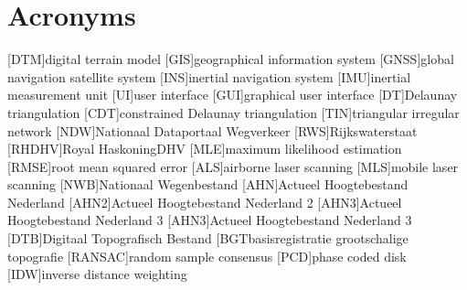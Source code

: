 \chapter*{Acronyms}

\begin{acronym}[UML]
  [DTM]{digital terrain model}
  [GIS]{geographical information system}
  [GNSS]{global navigation satellite system}
  [INS]{inertial navigation system}
  [IMU]{inertial measurement unit}
  [UI]{user interface}
  [GUI]{graphical user interface}
  [DT]{Delaunay triangulation}
  [CDT]{constrained Delaunay triangulation}
  [TIN]{triangular irregular network}
  [NDW]{Nationaal Dataportaal Wegverkeer}
  [RWS]{Rijkswaterstaat}
  [RHDHV]{Royal HaskoningDHV}
  [MLE]{maximum likelihood estimation}
  [RMSE]{root mean squared error}
  [ALS]{airborne laser scanning}
  [MLS]{mobile laser scanning}
  [NWB]{Nationaal Wegenbestand}
  [AHN]{Actueel Hoogtebestand Nederland}
  [AHN2]{Actueel Hoogtebestand Nederland 2}
  [AHN3]{Actueel Hoogtebestand Nederland 3}
  [AHN3]{Actueel Hoogtebestand Nederland 3}
  [DTB]{Digitaal Topografisch Bestand}
  [BGT{basisregistratie grootschalige topografie}
  [RANSAC]{random sample consensus}
  [PCD]{phase coded disk}
  [IDW]{inverse distance weighting}
\end{acronym}